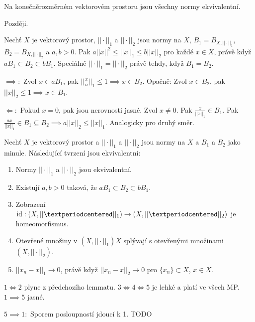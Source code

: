 \documentclass[12pt]{article}					%
\begin{document}
\begin{veta}
	Na konečněrozměrném vektorovém prostoru jsou všechny normy ekvivalentní.

	\begin{dukazin}
		Později.
	\end{dukazin}
\end{veta}

\begin{lemma}
	Nechť $X$ je vektorový prostor, $||·||_1$ a $||·||_2$ jsou normy na $X$, $B_1 = B_{X, ||·||_1}$, $B_2 = B_{X, ||·||_2}$ a $a, b > 0$. Pak $a||x||^2 ≤ ||x||_1 ≤ b||x||_2$ pro každé $x \in X$, právě když $a B_1 \subset B_2 \subset b B_1$. Speciálně $||·||_1 = ||·||_2$ právě tehdy, když $B_1 = B_2$.

	\begin{dukazin}
		$\implies:$ Zvol $x \in a B_1$, pak $||\frac{x}{a}||_1 ≤ 1 \implies x \in B_2$. Opačně: Zvol $x \in B_2$, pak $||x||_2 ≤ 1 \implies x \in B_1$.

		$\Leftarrow:$ Pokud $x = 0$, pak jsou nerovnosti jasné. Zvol $x≠0$. Pak $\frac{x}{||x||_1} \in B_1$. Pak $\frac{ax}{||x||_1} \in B_1 \subseteq B_2 \implies a||x||_2 ≤ ||x||_1$. Analogicky pro druhý směr.  
	\end{dukazin}
\end{lemma}

\begin{tvrzeni}
	Nechť $X$ je vektorový prostor a $||·||_1$ a $||·||_2$ jsou normy na $X$ a $B_1$ a $B_2$ jako minule. Následující tvrzení jsou ekvivalentní:
	\begin{enumerate}
		\item Normy $||·||_1$ a $||·||_2$ jsou ekvivalentní.
		\item Existují $a, b > 0$ taková, že $aB_1 \subset B_2 \subset bB_1$.
		\item Zobrazení $\id: (X, ||·||_1) \rightarrow \left(X, ||·||_2\right)$ je homeomorfismus.
		\item Otevřené množiny v $\left(X, ||·||_1\right)X$ splývají s otevřenými množinami $\left(X, ||·||_2\right)$.
		\item $||x_n - x||_1 \rightarrow 0$, právě když $||x_n - x||_2 \rightarrow 0$ pro $\{x_n\} \subset X$, $x \in X$.
	\end{enumerate}

	\begin{dukazin}
		$1 \Leftrightarrow 2$ plyne z předchozího lemmatu. $3 \Leftrightarrow 4 \Leftrightarrow 5$ je lehké a platí ve všech MP. $1 \implies 5$ jasné.

		$5 \implies 1:$ Sporem posloupností jdoucí k 1. TODO
	\end{dukazin}
\end{tvrzeni}
\end{document}
